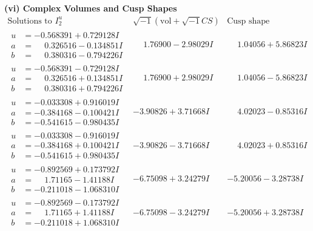 \documentclass[1p]{elsarticle_modified}
\theoremstyle{definition}
\newcommand{\I}{\sqrt{-1}}
\begin{document}
\newpage\flushleft \textbf{(vi) Complex Volumes and Cusp Shapes}
$$\begin{array}{c|c|c}  
\text{Solutions to }I^u_{2}& \I (\text{vol} + \sqrt{-1}CS) & \text{Cusp shape}\\
 \hline 
\begin{aligned}
u &= -0.568391 + 0.729128 I \\
a &= \phantom{-}0.326516 - 0.134851 I \\
b &= \phantom{-}0.380316 - 0.794226 I\end{aligned}
 & \phantom{-}1.76900 - 2.98029 I & \phantom{-}1.04056 + 5.86823 I \\ \hline\begin{aligned}
u &= -0.568391 - 0.729128 I \\
a &= \phantom{-}0.326516 + 0.134851 I \\
b &= \phantom{-}0.380316 + 0.794226 I\end{aligned}
 & \phantom{-}1.76900 + 2.98029 I & \phantom{-}1.04056 - 5.86823 I \\ \hline\begin{aligned}
u &= -0.033308 + 0.916019 I \\
a &= -0.384168 - 0.100421 I \\
b &= -0.541615 - 0.980435 I\end{aligned}
 & -3.90826 + 3.71668 I & \phantom{-}4.02023 - 0.85316 I \\ \hline\begin{aligned}
u &= -0.033308 - 0.916019 I \\
a &= -0.384168 + 0.100421 I \\
b &= -0.541615 + 0.980435 I\end{aligned}
 & -3.90826 - 3.71668 I & \phantom{-}4.02023 + 0.85316 I \\ \hline\begin{aligned}
u &= -0.892569 + 0.173792 I \\
a &= \phantom{-}1.71165 - 1.41188 I \\
b &= -0.211018 - 1.068310 I\end{aligned}
 & -6.75098 + 3.24279 I & -5.20056 - 3.28738 I \\ \hline\begin{aligned}
u &= -0.892569 - 0.173792 I \\
a &= \phantom{-}1.71165 + 1.41188 I \\
b &= -0.211018 + 1.068310 I\end{aligned}
 & -6.75098 - 3.24279 I & -5.20056 + 3.28738 I \\ \hline\begin{aligned}

\end{aligned}
\end{array}$$
\end{document}
